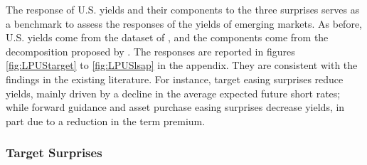 {The response of U.S. yields and their components to the three surprises serves as a benchmark to assess the responses of the yields of emerging markets. 
As before, U.S. yields come from the dataset of \cite{GSW:2007}, and the components come from the decomposition proposed by \cite{KimWright:2005}.
The responses are reported in figures \ref{fig:LPUStarget} to \ref{fig:LPUSlsap} in the appendix. 
They are consistent with the findings in the existing literature.
For instance, target easing surprises reduce yields, mainly driven by a decline in the average expected future short rates;
while forward guidance and asset purchase easing surprises decrease yields, in part due to a reduction in the term premium.


\subsubsection{Target Surprises}
\iftoggle{toclinks}{\gototoc}{} %

}

